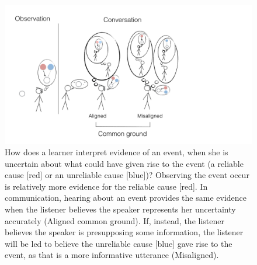 \documentclass[10pt,letterpaper]{article}
\newcommand{\red}[1]{\textcolor{Red}{#1}}
\begin{document}
\begin{figure}
\centering
    \includegraphics[width=\columnwidth]{cartoon-2}
    \caption{
        \small
How does a learner interpret evidence of an event, when she is uncertain about what could have given rise to the event (a reliable cause [red] or an unreliable cause [blue])? 
   Observing the event occur is relatively more evidence for the reliable cause [red]. 
    In communication, hearing about an event provides the same evidence when the listener believes the speaker represents her uncertainty accurately (Aligned common ground).
   If, instead, the listener believes the speaker is presupposing some information, the listener will be led to believe the unreliable cause [blue] gave rise to the event, as that is a more informative utterance (Misaligned).
    }
  \label{fig:cartoon}
\end{figure}
\end{document}
